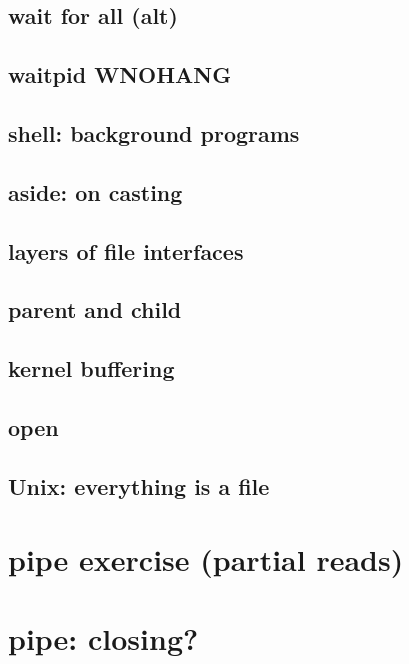 \subsection{wait for all (alt)}


\subsection{waitpid WNOHANG}


\subsection{shell: background programs}



\subsection{aside: on casting}




\subsection{layers of file interfaces}



\subsection{parent and child}



\subsection{kernel buffering}



\subsection{open}



\subsection{Unix: everything is a file}



\section{pipe exercise (partial reads)}


\section{pipe: closing?}


